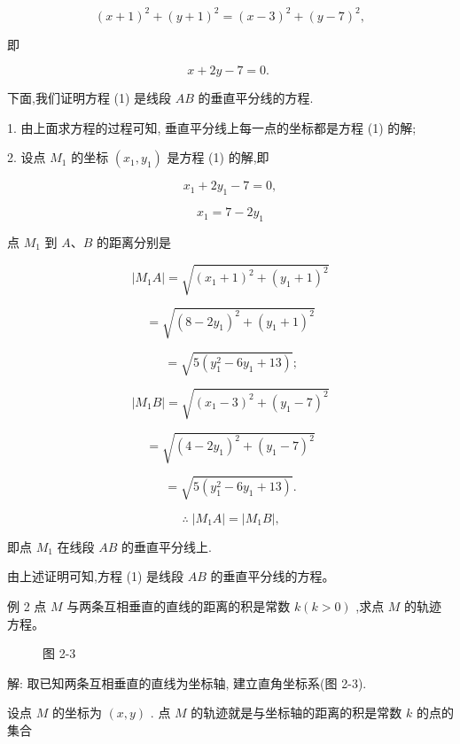 \documentclass[lang=cn,newtx,12pt,scheme=chinese]{elegantbook}
\begin{document}
\[
    {\left( x + 1\right) }^{2} + {\left( y + 1\right) }^{2} = {\left( x - 3\right) }^{2} + {\left( y - 7\right) }^{2},
\]

即

\[
  x + {2y} - 7 = 0\text{. } \tag{1}
\]

下面,我们证明方程 (1) 是线段 \({AB}\) 的垂直平分线的方程.

1. 由上面求方程的过程可知, 垂直平分线上每一点的坐标都是方程 (1) 的解;

2. 设点 \({M}_{1}\) 的坐标 \(\left( {{x}_{1},{y}_{1}}\right)\) 是方程 (1) 的解,即

\[
    {x}_{1} + 2{y}_{1} - 7 = 0,
\]

\[
    {x}_{1} = 7 - 2{y}_{1}
\]

点 \({M}_{1}\) 到 \(A\text{、}B\) 的距离分别是

\[
  \left| {{M}_{1}A}\right| = \sqrt{{\left( {x}_{1} + 1\right) }^{2} + {\left( {y}_{1} + 1\right) }^{2}}
\]

\[
  = \sqrt{{\left( 8 - 2{y}_{1}\right) }^{2} + {\left( {y}_{1} + 1\right) }^{2}}
\]

\[
  = \sqrt{5\left( {{y}_{1}^{2} - 6{y}_{1} + {13}}\right) }\text{;}
\]

\[
  \left| {{M}_{1}B}\right| = \sqrt{{\left( {x}_{1} - 3\right) }^{2} + {\left( {y}_{1} - 7\right) }^{2}}
\]

\[
  = \sqrt{{\left( 4 - 2{y}_{1}\right) }^{2} + {\left( {y}_{1} - 7\right) }^{2}}
\]

\[
  = \sqrt{5\left( {{y}_{1}^{2} - 6{y}_{1} + {13}}\right) }\text{.}
\]

\[
  \therefore \;\left| {{M}_{1}A}\right| = \left| {{M}_{1}B}\right| \text{,}
\]

即点 \({M}_{1}\) 在线段 \({AB}\) 的垂直平分线上.

由上述证明可知,方程 (1) 是线段 \({AB}\) 的垂直平分线的方程。

例 2 点 \(M\) 与两条互相垂直的直线的距离的积是常数 \(k\left( {k > 0}\right)\) ,求点 \(M\) 的轨迹方程。

\begin{figure}[h]
  \centering
  
  \caption{图 2-3}
\end{figure}

解: 取已知两条互相垂直的直线为坐标轴, 建立直角坐标系(图 2-3).

设点 \(M\) 的坐标为 \(\left( {x,y}\right)\) . 点 \(M\) 的轨迹就是与坐标轴的距离的积是常数 \(k\) 的点的集合
\end{document}
